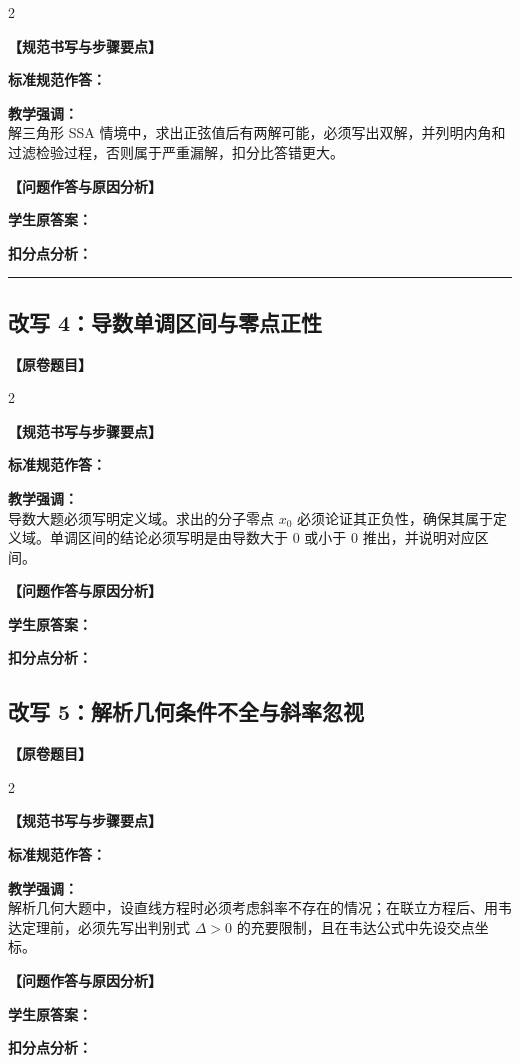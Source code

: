 \documentclass[11pt,a4paper]{ctexart}
\newcommand{\teachblock}[2]{%
  \par\addvspace{0.55em}%
  \noindent\textbf{【#1】}\par\nobreak
  \begingroup
    \raggedright
    \setlength{\parskip}{0.35em}%
    #2\par
  \endgroup
}
\begin{document}
\begin{paracol}{2}
\teachblock{规范书写与步骤要点}{
  \textbf{标准规范作答：}\\
  \qBadTriangleCorrect\par
  \textbf{教学强调：}\\
  解三角形 SSA 情境中，求出正弦值后有两解可能，必须写出双解，并列明内角和过滤检验过程，否则属于严重漏解，扣分比答错更大。
}

\switchcolumn
\teachblock{问题作答与原因分析}{
  \textbf{学生原答案：}\\
  \qBadTriangleWriteup\par
  \textbf{扣分点分析：}\\
  \qBadTriangleReason
}
\end{paracol}

\addvspace{1.0em}
\hrule
\addvspace{1.0em}

\subsection{改写 4：导数单调区间与零点正性}
\noindent\textbf{【原卷题目】} \qGeneralCheckFourStem

\begin{paracol}{2}
\teachblock{规范书写与步骤要点}{
  \textbf{标准规范作答：}\\
  \qBadDerivativeCorrect\par
  \textbf{教学强调：}\\
  导数大题必须写明定义域。求出的分子零点 \(x_0\) 必须论证其正负性，确保其属于定义域。单调区间的结论必须写明是由导数大于 0 或小于 0 推出，并说明对应区间。
}

\switchcolumn
\teachblock{问题作答与原因分析}{
  \textbf{学生原答案：}\\
  \qBadDerivativeWriteup\par
  \textbf{扣分点分析：}\\
  \qBadDerivativeReason
}
\end{paracol}

\newpage

\subsection{改写 5：解析几何条件不全与斜率忽视}
\noindent\textbf{【原卷题目】} \qGeneralCheckFiveStem

\begin{paracol}{2}
\teachblock{规范书写与步骤要点}{
  \textbf{标准规范作答：}\\
  \qBadAnalyticCorrect\par
  \textbf{教学强调：}\\
  解析几何大题中，设直线方程时必须考虑斜率不存在的情况；在联立方程后、用韦达定理前，必须先写出判别式 \(\Delta > 0\) 的充要限制，且在韦达公式中先设交点坐标。
}

\switchcolumn
\teachblock{问题作答与原因分析}{
  \textbf{学生原答案：}\\
  \qBadAnalyticWriteup\par
  \textbf{扣分点分析：}\\
  \qBadAnalyticReason
}
\end{paracol}
\end{document}
